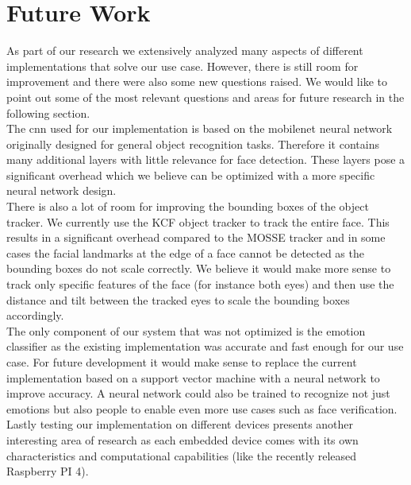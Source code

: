 \chapter{Future Work}
As part of our research we extensively analyzed many aspects of different implementations that solve our use case. However, there is still room for improvement and there were also some new questions raised. We would like to point out some of the most relevant questions and areas for future research in the following section.\\
The \gls{cnn} used for our implementation is based on the \gls{mobilenet} neural network originally designed for general object recognition tasks. Therefore it contains many additional layers with little relevance for face detection. These layers pose a significant overhead which we believe can be optimized with a more specific neural network design.\\
There is also a lot of room for improving the bounding boxes of the object tracker. We currently use the KCF object tracker to track the entire face. This results in a significant overhead compared to the MOSSE tracker and in some cases the facial landmarks at the edge of a face cannot be detected as the bounding boxes do not scale correctly. We believe it would make more sense to track only specific features of the face (for instance both eyes) and then use the distance and tilt between the tracked eyes to scale the bounding boxes accordingly.\\
The only component of our system that was not optimized is the emotion classifier as the existing implementation was accurate and fast enough for our use case. For future development it would make sense to replace the current implementation based on a support vector machine with a neural network to improve accuracy. A neural network could also be trained to recognize not just emotions but also people to enable even more use cases such as face verification.\\
Lastly testing our implementation on different devices presents another interesting area of research as each embedded device comes with its own characteristics and computational capabilities (like the recently released Raspberry PI 4). 
